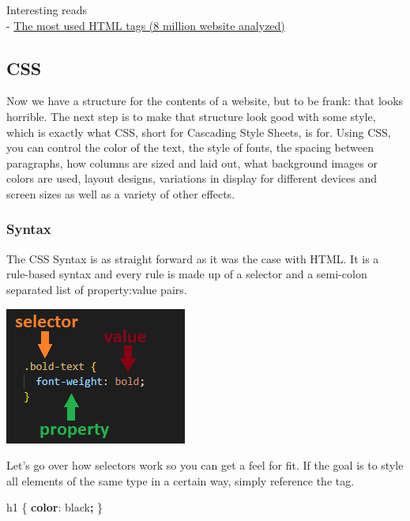 \documentclass[
]{article}
\newenvironment{Shaded}{\begin{snugshade}}{\end{snugshade}}
\newcommand{\ConstantTok}[1]{\textcolor[rgb]{0.00,0.00,0.00}{#1}}
\newcommand{\KeywordTok}[1]{\textcolor[rgb]{0.13,0.29,0.53}{\textbf{#1}}}
\newcommand{\NormalTok}[1]{#1}
\newcommand{\OperatorTok}[1]{\textcolor[rgb]{0.81,0.36,0.00}{\textbf{#1}}}
\begin{document}
Interesting reads\\
- \href{https://css-tricks.com/average-web-page-data-analyzing-8-million-websites/}{The most used HTML tags (8 million website analyzed)}

\hypertarget{css}{%
\subsection{CSS}\label{css}}

Now we have a structure for the contents of a website, but to be frank: that looks horrible. The next step is to make that structure look good with some style, which is exactly what CSS, short for Cascading Style Sheets, is for. Using CSS, you can control the color of the text, the style of fonts, the spacing between paragraphs, how columns are sized and laid out, what background images or colors are used, layout designs, variations in display for different devices and screen sizes as well as a variety of other effects.

\hypertarget{syntax}{%
\subsubsection*{Syntax}\label{syntax}}

The CSS Syntax is as straight forward as it was the case with HTML. It is a rule-based syntax and every rule is made up of a selector and a semi-colon separated list of property:value pairs.

\includegraphics{docs/assets/css_example.png}

Let's go over how selectors work so you can get a feel for fit. If the goal is to style all elements of the same type in a certain way, simply reference the tag.

\begin{Shaded}
\begin{Highlighting}[]
\NormalTok{h1 \{}
  \KeywordTok{color}\NormalTok{: }\ConstantTok{black}\OperatorTok{;}
\NormalTok{\}}
\end{Highlighting}
\end{Shaded}
\end{document}
